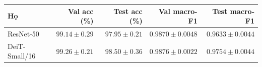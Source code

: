 \begin{tabular}{lrrrr}
\toprule
Họ & Val acc (\%) & Test acc (\%) & Val macro-F1 & Test macro-F1\\
\midrule
ResNet-50 & $99.14\pm 0.29$ & $97.95\pm 0.21$ & $0.9870\pm 0.0048$ & $0.9633\pm 0.0044$\\
DeiT-Small/16 & $99.26\pm 0.21$ & $98.50\pm 0.36$ & $0.9876\pm 0.0022$ & $0.9754\pm 0.0044$\\
\bottomrule
\end{tabular}
